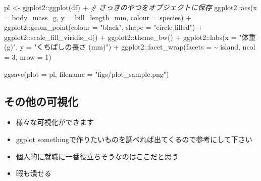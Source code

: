 \documentclass[
]{ltjsarticle}
\newenvironment{Shaded}{\begin{snugshade}}{\end{snugshade}}
\newcommand{\AttributeTok}[1]{\textcolor[rgb]{0.77,0.63,0.00}{#1}}
\newcommand{\CommentTok}[1]{\textcolor[rgb]{0.56,0.35,0.01}{\textit{#1}}}
\newcommand{\DecValTok}[1]{\textcolor[rgb]{0.00,0.00,0.81}{#1}}
\newcommand{\FunctionTok}[1]{\textcolor[rgb]{0.00,0.00,0.00}{#1}}
\newcommand{\NormalTok}[1]{#1}
\newcommand{\OtherTok}[1]{\textcolor[rgb]{0.56,0.35,0.01}{#1}}
\newcommand{\SpecialCharTok}[1]{\textcolor[rgb]{0.00,0.00,0.00}{#1}}
\newcommand{\StringTok}[1]{\textcolor[rgb]{0.31,0.60,0.02}{#1}}
\providecommand{\tightlist}{%
  \setlength{\itemsep}{0pt}\setlength{\parskip}{0pt}}
\begin{document}
\begin{Shaded}
\begin{Highlighting}[]
\NormalTok{pl }\OtherTok{\textless{}{-}}\NormalTok{ ggplot2}\SpecialCharTok{::}\FunctionTok{ggplot}\NormalTok{(df) }\SpecialCharTok{+} \CommentTok{\# さっきのやつをオブジェクトに保存}
\NormalTok{  ggplot2}\SpecialCharTok{::}\FunctionTok{aes}\NormalTok{(}\AttributeTok{x =}\NormalTok{ body\_mass\_g, }\AttributeTok{y =}\NormalTok{ bill\_length\_mm, }\AttributeTok{colour =}\NormalTok{ species) }\SpecialCharTok{+}
\NormalTok{  ggplot2}\SpecialCharTok{::}\FunctionTok{geom\_point}\NormalTok{(}\AttributeTok{colour =} \StringTok{"black"}\NormalTok{, }\AttributeTok{shape =} \StringTok{"circle filled"}\NormalTok{) }\SpecialCharTok{+}
\NormalTok{  ggplot2}\SpecialCharTok{::}\FunctionTok{scale\_fill\_viridis\_d}\NormalTok{() }\SpecialCharTok{+}
\NormalTok{  ggplot2}\SpecialCharTok{::}\FunctionTok{theme\_bw}\NormalTok{() }\SpecialCharTok{+}
\NormalTok{  ggplot2}\SpecialCharTok{::}\FunctionTok{labs}\NormalTok{(}\AttributeTok{x =} \StringTok{"体重 (g)"}\NormalTok{, }\AttributeTok{y =} \StringTok{"くちばしの長さ (mm)"}\NormalTok{) }\SpecialCharTok{+}
\NormalTok{  ggplot2}\SpecialCharTok{::}\FunctionTok{facet\_wrap}\NormalTok{(}\AttributeTok{facets =} \SpecialCharTok{\textasciitilde{}}\NormalTok{ island, }\AttributeTok{ncol =} \DecValTok{3}\NormalTok{, }\AttributeTok{nrow =} \DecValTok{1}\NormalTok{)}

\FunctionTok{ggsave}\NormalTok{(}\AttributeTok{plot =}\NormalTok{ pl, }\AttributeTok{filename =} \StringTok{"figs/plot\_sample.png"}\NormalTok{)}
\end{Highlighting}
\end{Shaded}

\hypertarget{ux305dux306eux4ed6ux306eux53efux8996ux5316}{%
\subsection{その他の可視化}\label{ux305dux306eux4ed6ux306eux53efux8996ux5316}}

\begin{itemize}
\tightlist
\item
  様々な可視化ができます
\item
  ggplot somethingで作りたいものを調べれば出てくるので参考にして下さい
\item
  個人的に就職に一番役立ちそうなのはここだと思う
\item
  暇も潰せる
\end{itemize}
\end{document}
